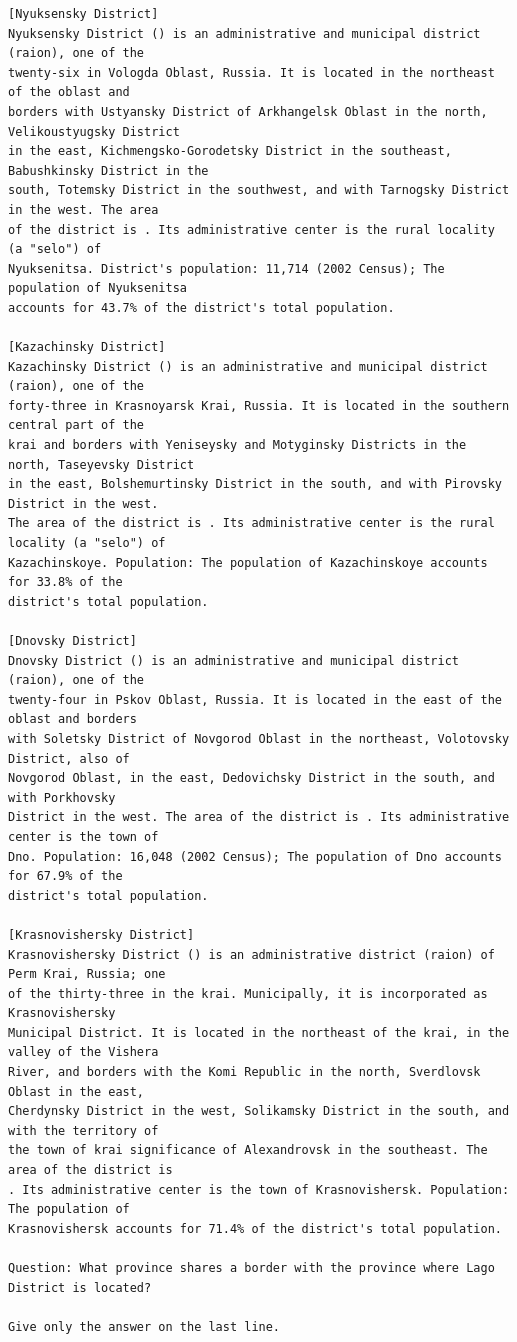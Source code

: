 \documentclass[10pt]{article}
\begin{document}
\begin{verbatim}
[Nyuksensky District]
Nyuksensky District () is an administrative and municipal district (raion), one of the
twenty-six in Vologda Oblast, Russia. It is located in the northeast of the oblast and
borders with Ustyansky District of Arkhangelsk Oblast in the north, Velikoustyugsky District
in the east, Kichmengsko-Gorodetsky District in the southeast, Babushkinsky District in the
south, Totemsky District in the southwest, and with Tarnogsky District in the west. The area
of the district is . Its administrative center is the rural locality (a "selo") of
Nyuksenitsa. District's population: 11,714 (2002 Census); The population of Nyuksenitsa
accounts for 43.7% of the district's total population.

[Kazachinsky District]
Kazachinsky District () is an administrative and municipal district (raion), one of the
forty-three in Krasnoyarsk Krai, Russia. It is located in the southern central part of the
krai and borders with Yeniseysky and Motyginsky Districts in the north, Taseyevsky District
in the east, Bolshemurtinsky District in the south, and with Pirovsky District in the west.
The area of the district is . Its administrative center is the rural locality (a "selo") of
Kazachinskoye. Population: The population of Kazachinskoye accounts for 33.8% of the
district's total population.

[Dnovsky District]
Dnovsky District () is an administrative and municipal district (raion), one of the
twenty-four in Pskov Oblast, Russia. It is located in the east of the oblast and borders
with Soletsky District of Novgorod Oblast in the northeast, Volotovsky District, also of
Novgorod Oblast, in the east, Dedovichsky District in the south, and with Porkhovsky
District in the west. The area of the district is . Its administrative center is the town of
Dno. Population: 16,048 (2002 Census); The population of Dno accounts for 67.9% of the
district's total population.

[Krasnovishersky District]
Krasnovishersky District () is an administrative district (raion) of Perm Krai, Russia; one
of the thirty-three in the krai. Municipally, it is incorporated as Krasnovishersky
Municipal District. It is located in the northeast of the krai, in the valley of the Vishera
River, and borders with the Komi Republic in the north, Sverdlovsk Oblast in the east,
Cherdynsky District in the west, Solikamsky District in the south, and with the territory of
the town of krai significance of Alexandrovsk in the southeast. The area of the district is
. Its administrative center is the town of Krasnovishersk. Population: The population of
Krasnovishersk accounts for 71.4% of the district's total population.

Question: What province shares a border with the province where Lago District is located?

Give only the answer on the last line.
\end{verbatim}
\end{document}
